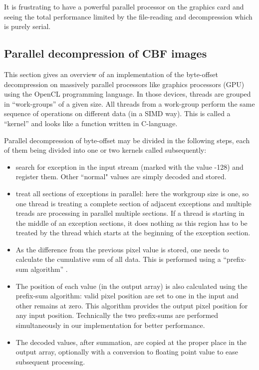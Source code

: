 \documentclass[preprint]{iucr}              %
\begin{document}
It is frustrating to have a powerful parallel processor on the
graphics card and seeing the total performance limited by the file-reading
 and decompression which is purely serial.

\subsection{Parallel decompression of CBF images}
 
This section gives an overview of an implementation of the byte-offset
decompression on massively parallel processors like graphics processors
(GPU) using the OpenCL \cite{opencl} programming language.
In those devices, threads are grouped in ``work-groups'' of a given size.
All threads from a work-group perform the same sequence of operations on
different data (in a SIMD way).
This is called a ``kernel'' and looks like a function written in C-language.

Parallel decompression of byte-offset may be divided in the following steps,
each of them being divided into one or two kernels called subsequently:
\begin{itemize}
  \item search for exception in the input stream (marked with the value -128)
  and register them. Other ``normal" values are simply decoded and stored.
  \item treat all sections of exceptions in parallel: here the workgroup size is
  one, so one thread is treating a complete section of adjacent exceptions
  and multiple treads are processing in parallel multiple sections. If a thread
  is starting in the middle of an exception sections, it does nothing as this
  region has to be treated by the thread which starts at the beginning of the 
  exception section.
  \item As the difference from the previous pixel value is stored, one needs to
  calculate the cumulative sum of all data. This is performed using a
  ``prefix-sum algorithm'' \cite{scan}.
  \item The position of each value (in the output array) is also calculated
  using the prefix-sum algorithm: valid pixel position are set to one in the
  input and other remains at zero. This algorithm provides the output pixel
  position for any input position.
  Technically the two prefix-sums are performed simultaneously in our
  implementation for better performance.
  \item The decoded values, after summation, are copied at the proper place in
  the output array, optionally with a conversion to floating point value to
  ease subsequent processing.
\end{itemize} 
\end{document}
